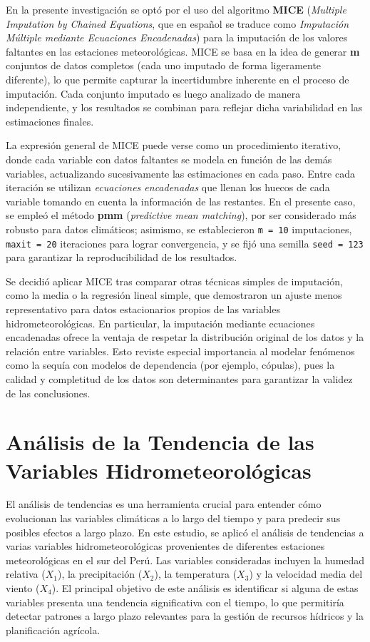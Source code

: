 \noindent
En la presente investigación se optó por el uso del algoritmo \textbf{MICE} (\textit{Multiple Imputation by Chained Equations}, que en español se traduce como \textit{Imputación Múltiple mediante Ecuaciones Encadenadas}) para la imputación de los valores faltantes en las estaciones meteorológicas. MICE se basa en la idea de generar \textbf{m} conjuntos de datos completos (cada uno imputado de forma ligeramente diferente), lo que permite capturar la incertidumbre inherente en el proceso de imputación. Cada conjunto imputado es luego analizado de manera independiente, y los resultados se combinan para reflejar dicha variabilidad en las estimaciones finales.

\noindent
La expresión general de MICE puede verse como un procedimiento iterativo, donde cada variable con datos faltantes se modela en función de las demás variables, actualizando sucesivamente las estimaciones en cada paso. Entre cada iteración se utilizan \textit{ecuaciones encadenadas} que llenan los huecos de cada variable tomando en cuenta la información de las restantes. En el presente caso, se empleó el método \textbf{pmm} (\textit{predictive mean matching}), por ser considerado más robusto para datos climáticos; asimismo, se establecieron \texttt{m = 10} imputaciones, \texttt{maxit = 20} iteraciones para lograr convergencia, y se fijó una semilla \texttt{seed = 123} para garantizar la reproducibilidad de los resultados.

\noindent
Se decidió aplicar MICE tras comparar otras técnicas simples de imputación, como la media o la regresión lineal simple, que demostraron un ajuste menos representativo para datos estacionarios propios de las variables hidrometeorológicas. En particular, la imputación mediante ecuaciones encadenadas ofrece la ventaja de respetar la distribución original de los datos y la relación entre variables. Esto reviste especial importancia al modelar fenómenos como la sequía con modelos de dependencia (por ejemplo, cópulas), pues la calidad y completitud de los datos son determinantes para garantizar la validez de las conclusiones.

\section{Análisis de la Tendencia de las Variables Hidrometeorológicas}

El análisis de tendencias es una herramienta crucial para entender cómo evolucionan las variables climáticas a lo largo del tiempo y para predecir sus posibles efectos a largo plazo. En este estudio, se aplicó el análisis de tendencias a varias variables hidrometeorológicas provenientes de diferentes estaciones meteorológicas en el sur del Perú. Las variables consideradas incluyen la humedad relativa (\( X_1 \)), la precipitación (\( X_2 \)), la temperatura (\( X_3 \)) y la velocidad media del viento (\( X_4 \)). El principal objetivo de este análisis es identificar si alguna de estas variables presenta una tendencia significativa con el tiempo, lo que permitiría detectar patrones a largo plazo relevantes para la gestión de recursos hídricos y la planificación agrícola.

